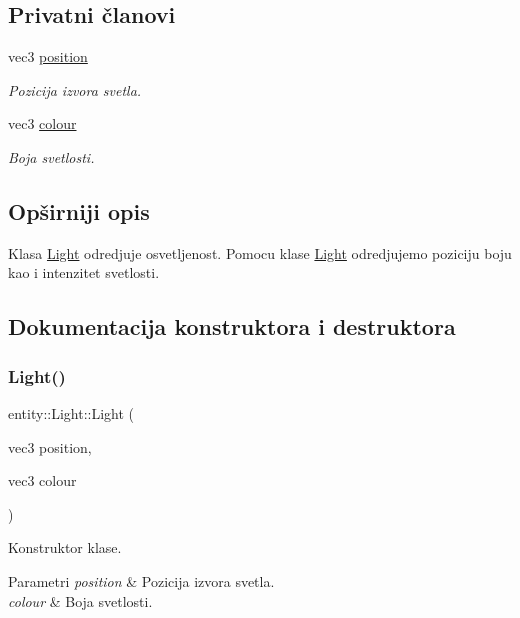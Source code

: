 \subsection*{Privatni članovi}
\begin{DoxyCompactItemize}
\item 
vec3 \hyperlink{classentity_1_1Light_a1c8e3d9bb8ba4f1c4e1c370cfa5ebe15}{position}
\begin{DoxyCompactList}\small\item\em Pozicija izvora svetla. \end{DoxyCompactList}\item 
vec3 \hyperlink{classentity_1_1Light_a637c529cb886fb092ea0775b4821671d}{colour}
\begin{DoxyCompactList}\small\item\em Boja svetlosti. \end{DoxyCompactList}\end{DoxyCompactItemize}


\subsection{Opširniji opis}
Klasa \hyperlink{classentity_1_1Light}{Light} odredjuje osvetljenost. Pomocu klase \hyperlink{classentity_1_1Light}{Light} odredjujemo poziciju boju kao i intenzitet svetlosti. 

\subsection{Dokumentacija konstruktora i destruktora}
\mbox{\label{classentity_1_1Light_a803705cea46720608058911bb426fa57}} 
\subsubsection{\texorpdfstring{Light()}{Light()}}
{\footnotesize\ttfamily entity\+::\+Light\+::\+Light (\begin{DoxyParamCaption}\item[{vec3}]{position,  }\item[{vec3}]{colour }\end{DoxyParamCaption})}



Konstruktor klase. 


\begin{DoxyParams}{Parametri}
{\em position} & Pozicija izvora svetla. \\
\hline
{\em colour} & Boja svetlosti. \\
\hline
\end{DoxyParams}
\mbox{\label{classentity_1_1Light_a7d0af8d0bea98a97c4e61c23b562f6fa}} 
